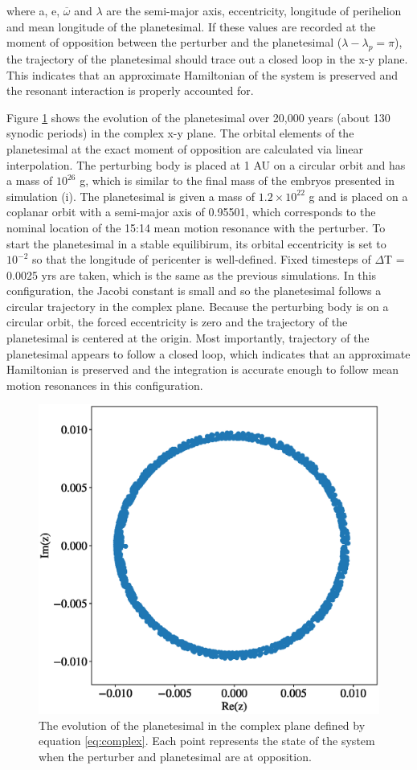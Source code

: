 \noindent where a, e, $\overline{\omega}$ and $\lambda$ are the semi-major axis, eccentricity, longitude of perihelion and mean 
longitude of the planetesimal. If these values are recorded at the moment of opposition between the perturber and the 
planetesimal ($\lambda - \lambda_{p} = \pi$), the trajectory of the planetesimal should trace out a closed loop in the x-y plane. 
This indicates that an approximate Hamiltonian of the system is preserved and the resonant interaction is properly accounted for.

Figure \ref{fig:threebody} shows the evolution of the planetesimal over 20,000 years (about 130 synodic periods) in the complex 
x-y plane. The orbital elements of the planetesimal at the exact moment of opposition are calculated via linear interpolation. The 
perturbing body is placed at 1 AU on a circular orbit and has a mass of $10^{26}$ g, which is similar to the final mass of the 
embryos presented in simulation (i). The planetesimal is given a mass of $1.2 \times 10^{22}$ g and is placed on a coplanar 
orbit with a semi-major axis of 0.95501, which corresponds to the nominal location of the 15:14 mean motion resonance with the 
perturber. To start the planetesimal in a stable equilibirum, its orbital eccentricity is set to $10^{-2}$ so that the longitude of 
pericenter is well-defined. Fixed timesteps of $\Delta$T = 0.0025 yrs are taken, which is the same as the previous simulations. In 
this configuration, the Jacobi constant is small and so the planetesimal follows a circular trajectory in the complex plane. 
Because the perturbing body is on a circular orbit, the forced eccentricity is zero and the trajectory of the planetesimal is 
centered at the origin. Most importantly, trajectory of the planetesimal appears to follow a closed loop, which indicates that an 
approximate Hamiltonian is preserved and the integration is accurate enough to follow mean motion resonances in this 
configuration.

\begin{figure}
    \begin{centering}
    \includegraphics[width=0.5\columnwidth]{figures/plSS/threebody_complex.eps}
    \caption{The evolution of the planetesimal in the complex plane defined by equation \ref{eq:complex}. Each point represents 
    the state of the system when the perturber and planetesimal are at opposition.}
    \label{fig:threebody}
    \end{centering}
\end{figure}

